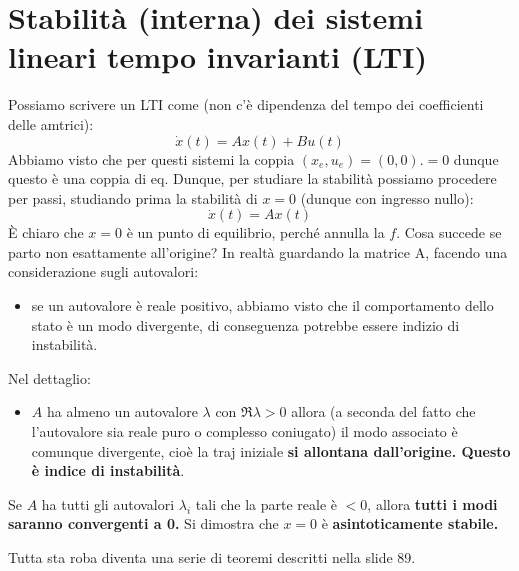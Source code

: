 \documentclass[a4paper]{report}
\begin{document}
\section{Stabilità (interna) dei sistemi lineari tempo invarianti (LTI)}
Possiamo scrivere un LTI come (non c'è dipendenza del tempo dei coefficienti delle amtrici):
\begin{equation*}
	\dot x(t) = Ax(t) + Bu(t)
\end{equation*}
Abbiamo visto che per questi sistemi la coppia $(x_e, u_e) = (0,0). = 0$ dunque questo è una coppia di eq. Dunque, per studiare la stabilità possiamo procedere per passi, studiando prima la stabilità di $x= 0$ (dunque con ingresso nullo):
\begin{equation*}
	\dot x(t) =Ax(t)
\end{equation*}
È chiaro che $x= 0$ è un punto di equilibrio, perché annulla la $f$. Cosa succede se parto non esattamente all'origine? In realtà guardando la matrice A, facendo una considerazione sugli autovalori:
\begin{itemize}
	\item se un autovalore è reale positivo, abbiamo visto che il comportamento dello stato è un modo divergente, di conseguenza potrebbe essere indizio di instabilità.
\end{itemize}
Nel dettaglio:
\begin{itemize}
	\item $A$ ha almeno un autovalore $\lambda$ con $\Re{\lambda} > 0$ allora (a seconda del fatto che l'autovalore sia reale puro o complesso coniugato) il modo associato è comunque divergente, cioè la traj iniziale \textbf{si allontana dall'origine. Questo è indice di instabilità}.
\end{itemize}

\begin{defin}{}{}
Se $A$ ha tutti gli autovalori $\lambda_i$ tali che la parte reale è $< 0$, allora \textbf{tutti i modi saranno convergenti a 0.}	Si dimostra che $x= 0$ è \textbf{asintoticamente stabile.}
\end{defin}

Tutta sta roba diventa una serie di teoremi descritti nella slide 89.
\end{document}
